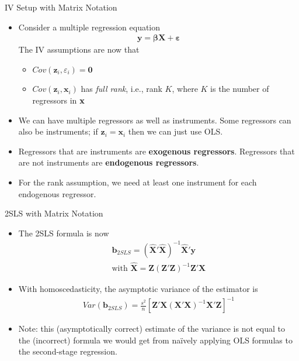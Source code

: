 \documentclass[aspectratio=169,11pt]{beamer}
\begin{document}
\begin{frame}{IV Setup with Matrix Notation}
\begin{itemize}
\item Consider a multiple regression equation
\begin{align*}
\boldsymbol{y}=\boldsymbol{\beta}\boldsymbol{X}+\boldsymbol{\varepsilon}
\end{align*}
The IV assumptions are now that
\begin{itemize}
\item $Cov\left(\boldsymbol{z}_{i},\varepsilon_{i}\right)=\boldsymbol{0}$
\item $Cov\left(\boldsymbol{z}_{i},\boldsymbol{x}_{i}\right)$ has \emph{full rank}, i.e., rank $K$, where $K$ is
	the number of regressors in $\bf{x}$
\end{itemize}
\item We can have multiple regressors as well as instruments. Some regressors can also be instruments; if $\boldsymbol{z}_{i}=\boldsymbol{x}_{i}$
then we can just use OLS.
\item Regressors that are instruments are \textbf{exogenous regressors}.
Regressors that are not instruments are \textbf{endogenous regressors}.
\item For the rank assumption, we need at least one instrument for each
endogenous regressor.
\end{itemize}
\end{frame}


\begin{frame}{2SLS with Matrix Notation}
\begin{itemize}
\item The 2SLS formula is now
\begin{align*}
\boldsymbol{b}_{2SLS}=\left(\hat{\boldsymbol{X}}'\hat{\boldsymbol{X}}\right)^{-1}\hat{\boldsymbol{X}}'\boldsymbol{y}\\
	\text{with }\hat{\boldsymbol{X}}=\boldsymbol{Z}\left(\boldsymbol{Z}'\boldsymbol{Z}\right)^{-1}\boldsymbol{Z}'\boldsymbol{X}
\end{align*}
\smallskip
\item With homoscedasticity, the asymptotic variance of the estimator is
\begin{align*}
Var\left(\boldsymbol{b}_{2SLS}\right)=\frac{s^{2}}{n}\left[\boldsymbol{Z}'\boldsymbol{X}\left(\boldsymbol{X}'\boldsymbol{X}\right)^{-1}\boldsymbol{X}'\boldsymbol{Z}\right]^{-1}
\end{align*}
\smallskip
	\item Note: this  (asymptotically correct) estimate of the variance is not equal to the (incorrect) formula we would get
	from na{\"i}vely applying OLS formulas to the second-stage regression.

\end{itemize}
\end{frame}
\end{document}
